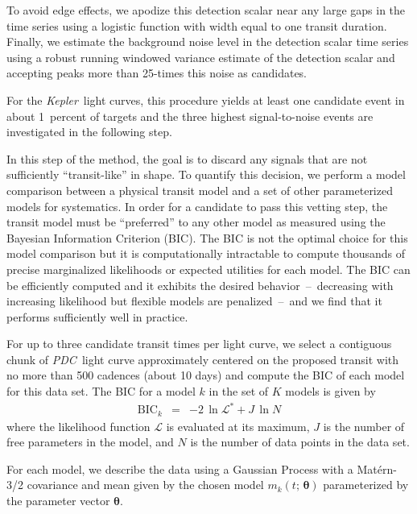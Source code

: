 \documentclass[manuscript, letterpaper]{aastex6}
\makeatletter
\let\origsubsection\subsection
\renewcommand\subsection{\@ifstar{\starsubsection}{\nostarsubsection}}
\newcommand\nostarsubsection[1]{\subsectionprelude\origsubsection{#1}}
\newcommand\starsubsection[1]{\subsectionprelude\origsubsection*{#1}}
\newcommand\subsectionprelude{\vspace{1em}}
\newcommand{\project}[1]{\textsl{#1}}
\newcommand{\kepler}{\project{Kepler}}
\newcommand{\pdc}{\project{PDC}}
\newcommand{\sectlabel}[1]{\label{sect:#1}}
\newcommand{\bvec}[1]{{\ensuremath{\boldsymbol{#1}}}}
\newcommand{\meanpars}{{\ensuremath{\bvec{\theta}}}}
\makeatother
\begin{document}
To avoid edge effects, we apodize this detection scalar near any large gaps in
the time series using a logistic function with width equal to one transit
duration.
Finally, we estimate the background noise level in the detection scalar time
series using a robust running windowed variance estimate of the detection
scalar and accepting peaks more than 25-times this noise as candidates.

For the \kepler\ light curves, this procedure yields at least one candidate
event in about 1~percent of targets and the three highest signal-to-noise
events are investigated in the following step.

\subsection{Step 2 -- Light curve vetting}\sectlabel{light-curve-vetting}

In this step of the method, the goal is to discard any signals that are not
sufficiently ``transit-like'' in shape.
To quantify this decision, we perform a model comparison between a physical
transit model and a set of other parameterized models for systematics.
In order for a candidate to pass this vetting step, the transit model must be
``preferred'' to any other model as measured using the Bayesian Information
Criterion (BIC).
The BIC is not the optimal choice for this model comparison but it is
computationally intractable to compute thousands of precise marginalized
likelihoods or expected utilities for each model.
The BIC can be efficiently computed and it exhibits the desired
behavior~--~decreasing with increasing likelihood but flexible models are
penalized~--~and we find that it performs sufficiently well in practice.

For up to three candidate transit times per light curve, we select a
contiguous chunk of \pdc\ light curve approximately centered on the proposed
transit with no more than 500 cadences (about 10 days) and compute the BIC of
each model for this data set.
The BIC for a model $k$ in the set of $K$ models is given by
\begin{eqnarray}
\mathrm{BIC}_k &=& -2\,\ln \mathcal{L}^* + J\,\ln N
\end{eqnarray}
where the likelihood function $\mathcal{L}$ is evaluated at its maximum, $J$
is the number of free parameters in the model, and $N$ is the number of
data points in the data set.

For each model, we describe the data using a Gaussian Process
\citep[GP;][]{Rasmussen:2006} with a Mat\'ern-3/2 covariance and mean given by
the chosen model $m_k(t;\,\meanpars)$ parameterized by the parameter vector
\meanpars.
\end{document}
